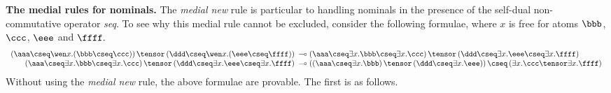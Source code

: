 \documentclass[UKenglish,acmsmall,authorversion]{acmart}
\theoremstyle{plain}
\begin{document}
\textbf{The medial rules for nominals.}
The \textit{medial new} rule is particular to handling nominals in the presence of the self-dual non-commutative operator \textit{seq}. To see why this medial rule cannot be excluded, consider the following
formulae, where $x$ is free for atoms $\bbb$, $\ccc$, $\eee$ and $\ffff.$
\[
\begin{array}{rl}
 \left( \aaa \cseq \mathopen{\wen x.}\left( \bbb \cseq \ccc \right)\right) \tensor \left( \ddd \cseq \mathopen{\wen x.}\left( \eee \cseq \ffff \right) \right)
 \!\!\!&\multimap
 \left( \aaa \cseq \exists x. \bbb \cseq \exists x. \ccc \right) \tensor \left( \ddd \cseq \exists x. \eee \cseq \exists x .\ffff \right) 
\\
 \left( \aaa \cseq \exists x. \bbb \cseq \exists x .\ccc \right) \tensor \left( \ddd \cseq \exists x. \eee \cseq \exists x .\ffff \right) 
 \!\!\!&\multimap
 \left(\left( \aaa \cseq \exists x .\bbb \right) \tensor \left( \ddd \cseq \exists x. \eee \right)\right) \cseq \left( \exists x. \ccc \tensor \exists x. \ffff \right)
\end{array}
\]
Without using the \textit{medial new} rule, the above formulae are provable.
The first is as follows.
\end{document}
